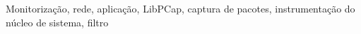 

% 
% 
% 

\begin{keywords}
Monitorização, rede, aplicação, LibPCap, captura de pacotes, instrumentação do núcleo de sistema, filtro
\end{keywords}
